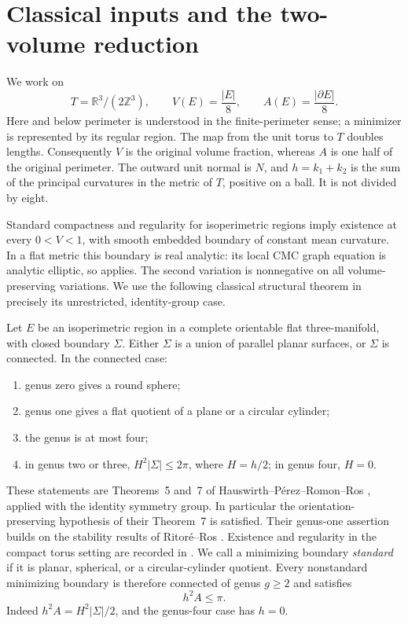 \section{Classical inputs and the two-volume reduction}
\label{pre:section}

We work on
\[
 T=\mathbb R^3/(2\mathbb Z^3),
 \qquad V(E)=\frac{|E|}{8},
 \qquad A(E)=\frac{|\partial E|}{8}.
\]
Here and below perimeter is understood in the finite-perimeter sense; a
minimizer is represented by its regular region. The map from the unit torus
to \(T\) doubles lengths. Consequently \(V\) is the original volume fraction,
whereas \(A\) is one half of the original perimeter. The outward unit normal
is \(N\), and \(h=k_1+k_2\) is the sum of the principal curvatures in the
metric of \(T\), positive on a ball. It is not divided by eight.

Standard compactness and regularity for isoperimetric regions imply existence
at every \(0<V<1\), with smooth embedded boundary of constant mean curvature.
In a flat metric this boundary is real analytic: its local CMC graph
equation is analytic elliptic, so
\cite[Theorem~1.1]{Blatt} applies. The second variation is
nonnegative on all volume-preserving variations. We use the following
classical structural theorem in precisely its unrestricted, identity-group
case.

\begin{theorem}\label{pre:structure}
Let \(E\) be an isoperimetric region in a complete orientable flat
three-manifold, with closed boundary \(\Sigma\).
Either \(\Sigma\) is a union of parallel planar surfaces, or \(\Sigma\)
is connected. In the connected case:
\begin{enumerate}
\renewcommand{\labelenumi}{\textup{(\roman{enumi})}}
\item genus zero gives a round sphere;
\item genus one gives a flat quotient of a plane or a circular cylinder;
\item the genus is at most four;
\item in genus two or three, \(H^2|\Sigma|\le 2\pi\), where \(H=h/2\);
in genus four, \(H=0\).
\end{enumerate}
\end{theorem}

These statements are Theorems~5 and~7 of Hauswirth--P\'erez--Romon--Ros
\cite{HPRR}, applied with the identity symmetry group. In particular the
orientation-preserving hypothesis of their Theorem~7 is satisfied. Their
genus-one assertion builds on the stability results of
Ritor\'e--Ros \cite{RitoreRos92,RitoreRos96}. Existence and regularity in the
compact torus setting are recorded in \cite[Theorem~3]{HPRR}.
We call a minimizing boundary \emph{standard} if it is planar, spherical,
or a circular-cylinder quotient. Every nonstandard minimizing boundary
is therefore connected of genus \(g\ge2\) and satisfies
\begin{equation}
 h^2 A\le\pi.
 \label{pre:curvature}
\end{equation}
Indeed \(h^2A=H^2|\Sigma|/2\), and the genus-four case has \(h=0\).

